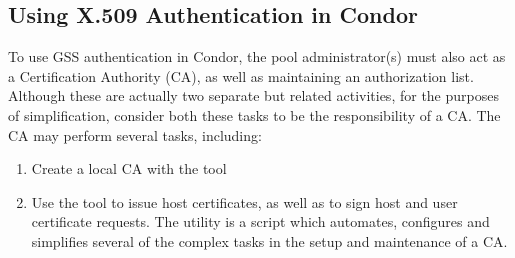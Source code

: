 \subsection{\label{sec:Condor-X509-Authentication}Using X.509 Authentication
in Condor}

To use GSS authentication in Condor, the pool administrator(s) must also
act as a Certification Authority (CA), as well as maintaining an authorization
list. Although these are actually two separate but related activities, for
the purposes of simplification, consider both these tasks to be the 
responsibility of a CA. The CA may perform several tasks, including:
\begin{enumerate}
\item Create a local CA with the tool 
\item Use the tool  to issue host certificates, as well
as to sign host and user certificate requests. The  utility
is a script which automates, configures and simplifies several of the complex
tasks in the setup and maintenance of a CA. 
\end{enumerate}


